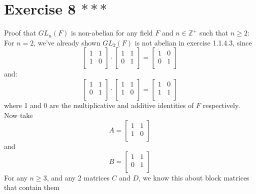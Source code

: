 \documentclass{article}
\newcommand{\Z}{\mathbb{Z}}
\begin{document}
    \section*{Exercise 8 $***$}
    Proof that $GL_n(F)$ is non-abelian for any field $F$
    and $n \in \Z^+$ such that $n \geqslant 2$: \\
    For $n = 2$, we've already shown $GL_2(F)$ is not abelian in exercise
    1.1.4.3, since  
    \[ \begin{bmatrix}
        1 & 1 \\
        1 & 0 \\
    \end{bmatrix} \cdot
    \begin{bmatrix}
        1 & 1 \\
        0 & 1 \\
    \end{bmatrix}
    = \begin{bmatrix}
        1 & 0 \\
        0 & 1 \\
    \end{bmatrix} \]
    and: 
    \[ \begin{bmatrix}
        1 & 1 \\
        0 & 1 \\
    \end{bmatrix} \cdot
    \begin{bmatrix}
        1 & 1 \\
        1 & 0 \\
    \end{bmatrix}
    = \begin{bmatrix}
        1 & 0 \\
        1 & 1 \\
    \end{bmatrix} \]
    where 1 and 0 are the multiplicative and additive identities of
    $F$ respectively. \\
    Now take 
    \[ A = \begin{bmatrix}
        1 & 1 \\
        1 & 0 \\
    \end{bmatrix}\]
    and
    \[ B = \begin{bmatrix}
        1 & 1 \\
        0 & 1 \\
    \end{bmatrix} \]
    For any $n \geqslant 3$,
    and any 2 matrices $C$ and $D$,
    we know this about block matrices that contain them
\end{document}
